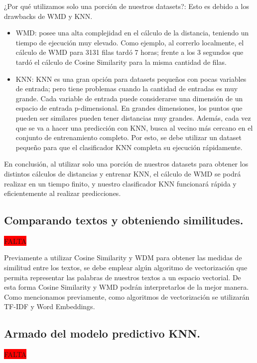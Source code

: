 \documentclass[12pt,a4paper]{article}
\begin{document}
¿Por qué utilizamos solo una porción de nuestros datasets?: Esto es debido a los drawbacks de WMD y KNN.
\begin{itemize}
\item WMD: posee una alta complejidad en el cálculo de la distancia, teniendo un tiempo de ejecución muy elevado. Como ejemplo, al correrlo localmente, el cálculo de WMD para 3131 filas tardó 7 horas; frente a los 3 segundos que tardó el cálculo de Cosine Similarity para la misma cantidad de filas.
\item KNN: KNN es una gran opción para datasets pequeños con pocas variables de entrada; pero tiene problemas cuando la cantidad de entradas es muy grande. Cada variable de entrada puede considerarse una dimensión de un espacio de entrada p-dimensional. En grandes dimensiones, los puntos que pueden ser similares pueden tener distancias muy grandes. Además, cada vez que se va a hacer una predicción con KNN, busca al vecino más cercano en el conjunto de entrenamiento completo. Por esto, se debe utilizar un dataset pequeño para que el clasificador KNN completa su ejecución rápidamente.
\end{itemize}
En conclusión, al utilizar solo una porción de nuestros datasets para obtener los distintos cálculos de distancias y entrenar KNN, el cálculo de WMD se podrá realizar en un tiempo finito, y nuestro clasificador KNN funcionará rápida y eficientemente al realizar predicciones.

\cleardoublepage

\subsection{Comparando textos y obteniendo similitudes.}
\colorbox{red}{FALTA}

Previamente a utilizar Cosine Similarity y WDM para obtener las medidas de similitud entre los textos, se debe emplear algún algoritmo de vectorización que permita representar las palabras de nuestros textos a un espacio vectorial. De esta forma Cosine Similarity y WMD podrán interpretarlos de la mejor manera.  Como mencionamos previamente, como algoritmos de vectorización se utilizarán TF-IDF y Word Embeddings. 

\cleardoublepage

\subsection{Armado del modelo predictivo KNN.}
\colorbox{red}{FALTA}
\end{document}
